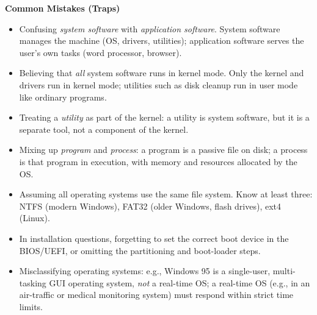 \documentclass[11pt]{article}
\begin{document}
\begin{bilan}
\textbf{Common Mistakes (Traps)}
\begin{itemize}
\item Confusing \emph{system software} with \emph{application software}. System software manages the machine (OS, drivers, utilities); application software serves the user's own tasks (word processor, browser).
\item Believing that \emph{all} system software runs in kernel mode. Only the kernel and drivers run in kernel mode; utilities such as disk cleanup run in user mode like ordinary programs.
\item Treating a \emph{utility} as part of the kernel: a utility is system software, but it is a separate tool, not a component of the kernel.
\item Mixing up \emph{program} and \emph{process}: a program is a passive file on disk; a process is that program in execution, with memory and resources allocated by the OS.
\item Assuming all operating systems use the same file system. Know at least three: NTFS (modern Windows), FAT32 (older Windows, flash drives), ext4 (Linux).
\item In installation questions, forgetting to set the correct boot device in the BIOS/UEFI, or omitting the partitioning and boot-loader steps.
\item Misclassifying operating systems: e.g., Windows 95 is a single-user, multi-tasking GUI operating system, \emph{not} a real-time OS; a real-time OS (e.g., in an air-traffic or medical monitoring system) must respond within strict time limits.
\end{itemize}


\end{bilan}
\end{document}
